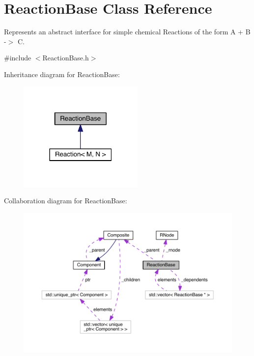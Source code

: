 \hypertarget{classReactionBase}{\section{Reaction\+Base Class Reference}
\label{classReactionBase}
}


Represents an abstract interface for simple chemical Reactions of the form A + B -\/$>$ C.  




{\ttfamily \#include $<$Reaction\+Base.\+h$>$}



Inheritance diagram for Reaction\+Base\+:\nopagebreak
\begin{figure}[H]
\begin{center}
\leavevmode
\includegraphics[width=174pt]{classReactionBase__inherit__graph}
\end{center}
\end{figure}


Collaboration diagram for Reaction\+Base\+:\nopagebreak
\begin{figure}[H]
\begin{center}
\leavevmode
\includegraphics[width=350pt]{classReactionBase__coll__graph}
\end{center}
\end{figure}
